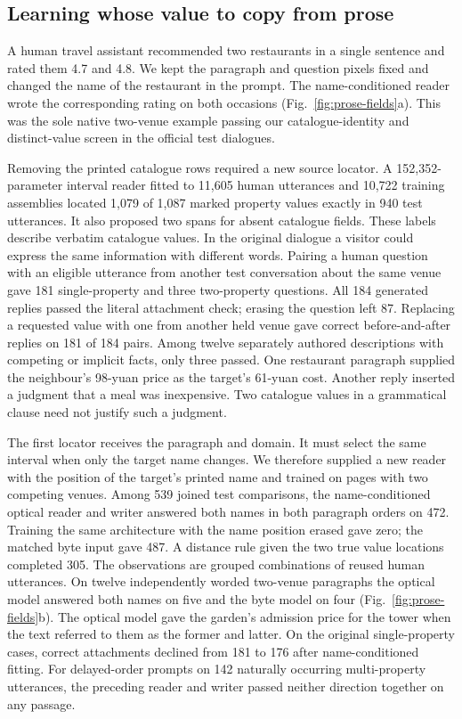 \documentclass[12pt,a4paper]{article}
\providecommand{\DIFadd}[1]{{\protect\color{blue} \sf #1}} %
\begin{document}
\subsection*{\DIFadd{Learning whose value to copy from prose}}
\DIFadd{A human travel assistant recommended two restaurants in a single sentence and rated them 4.7 and 4.8. We kept the paragraph and question pixels fixed and changed the name of the restaurant in the prompt. The name-conditioned reader wrote the corresponding rating on both occasions (Fig.~\ref{fig:prose-fields}a). This was the sole native two-venue example passing our catalogue-identity and distinct-value screen in the official test dialogues.
}

\DIFadd{Removing the printed catalogue rows required a new source locator. A 152,352-parameter interval reader fitted to 11,605 human utterances and 10,722 training assemblies located 1,079 of 1,087 marked property values exactly in 940 test utterances. It also proposed two spans for absent catalogue fields. These labels describe verbatim catalogue values. In the original dialogue a visitor could express the same information with different words. Pairing a human question with an eligible utterance from another test conversation about the same venue gave 181 single-property and three two-property questions. All 184 generated replies passed the literal attachment check; erasing the question left 87. Replacing a requested value with one from another held venue gave correct before-and-after replies on 181 of 184 pairs. Among twelve separately authored descriptions with competing or implicit facts, only three passed. One restaurant paragraph supplied the neighbour's 98-yuan price as the target's 61-yuan cost. Another reply inserted a judgment that a meal was inexpensive. Two catalogue values in a grammatical clause need not justify such a judgment.
}

\DIFadd{The first locator receives the paragraph and domain. It must select the same interval when only the target name changes. We therefore supplied a new reader with the position of the target's printed name and trained on pages with two competing venues. Among 539 joined test comparisons, the name-conditioned optical reader and writer answered both names in both paragraph orders on 472. Training the same architecture with the name position erased gave zero; the matched byte input gave 487. A distance rule given the two true value locations completed 305. The observations are grouped combinations of reused human utterances. On twelve independently worded two-venue paragraphs the optical model answered both names on five and the byte model on four (Fig.~\ref{fig:prose-fields}b). The optical model gave the garden's admission price for the tower when the text referred to them as the former and latter. On the original single-property cases, correct attachments declined from 181 to 176 after name-conditioned fitting. For delayed-order prompts on 142 naturally occurring multi-property utterances, the preceding reader and writer passed neither direction together on any passage.
}
\end{document}
